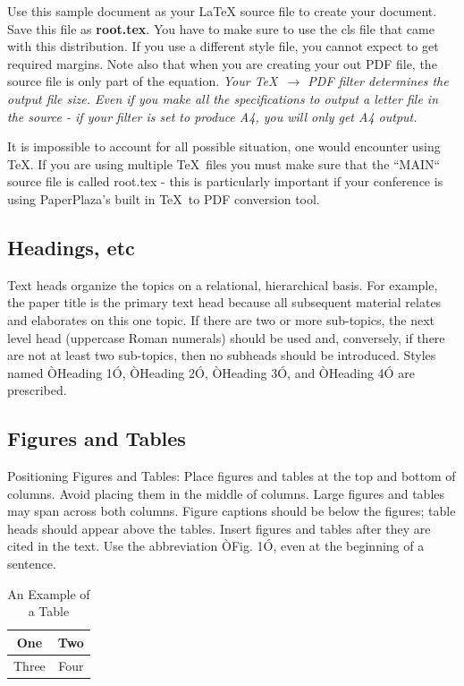 \documentclass[letterpaper, 10 pt, conference]{ieeeconf}  %
\begin{document}
Use this sample document as your LaTeX source file to create your document. Save this file as {\bf root.tex}. You have to make sure to use the cls file that came with this distribution. If you use a different style file, you cannot expect to get required margins. Note also that when you are creating your out PDF file, the source file is only part of the equation. {\it Your \TeX\ $\rightarrow$ PDF filter determines the output file size. Even if you make all the specifications to output a letter file in the source - if your filter is set to produce A4, you will only get A4 output. }

It is impossible to account for all possible situation, one would encounter using \TeX. If you are using multiple \TeX\ files you must make sure that the ``MAIN`` source file is called root.tex - this is particularly important if your conference is using PaperPlaza's built in \TeX\ to PDF conversion tool.

\subsection{Headings, etc}

Text heads organize the topics on a relational, hierarchical basis. For example, the paper title is the primary text head because all subsequent material relates and elaborates on this one topic. If there are two or more sub-topics, the next level head (uppercase Roman numerals) should be used and, conversely, if there are not at least two sub-topics, then no subheads should be introduced. Styles named ÒHeading 1Ó, ÒHeading 2Ó, ÒHeading 3Ó, and ÒHeading 4Ó are prescribed.

\subsection{Figures and Tables}

Positioning Figures and Tables: Place figures and tables at the top and bottom of columns. Avoid placing them in the middle of columns. Large figures and tables may span across both columns. Figure captions should be below the figures; table heads should appear above the tables. Insert figures and tables after they are cited in the text. Use the abbreviation ÒFig. 1Ó, even at the beginning of a sentence.

\begin{table}[h]
\caption{An Example of a Table}
\label{table_example}
\begin{center}
\begin{tabular}{|c||c|}
\hline
One & Two\\
\hline
Three & Four\\
\hline
\end{tabular}
\end{center}
\end{table}
\end{document}
